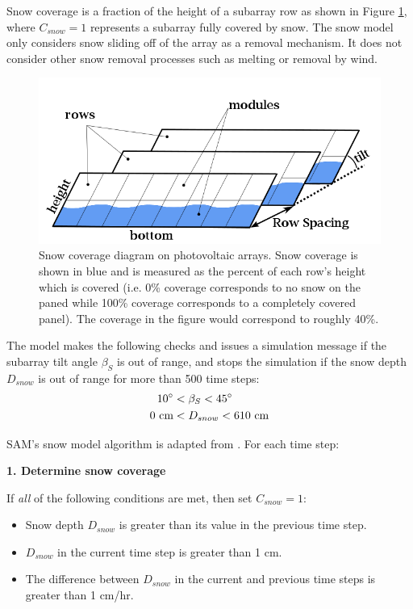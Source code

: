 \documentclass[12pt,letterpaper]{article}
\begin{document}
Snow coverage is a fraction of the height of a subarray row as shown in Figure \ref{fig-snowCoverage}, where $C_{snow}=1$ represents a subarray fully covered by snow. The snow model only considers snow sliding off of the array as a removal mechanism. It does not consider other snow removal processes such as melting or removal by wind.

\begin{figure}
\begin{center}
\includegraphics[scale=0.5]{snow-coverage-diagram}
\caption{Snow coverage diagram on photovoltaic arrays. Snow coverage is shown in blue and is measured as the percent of each row's height which is covered (i.e. 0\% coverage corresponds to no snow on the paned while 100\% coverage corresponds to a completely covered panel). The coverage in the figure would correspond to roughly 40\%.}
\label{fig-snowCoverage}
\end{center}
\end{figure}

The model makes the following checks and issues a simulation message if the subarray tilt angle $\beta_S$ is out of range, and stops the simulation if the snow depth $D_{snow}$ is out of range for more than 500 time steps:
\begin{align*}
10^\circ &< \beta_{S} < 45^\circ \notag \\
0~\text{cm} &< D_{snow} < 610~\text{cm}
\end{align*}

SAM's snow model algorithm is adapted from \citet{marion-snowmodel}. For each time step:

\textbf{1. Determine snow coverage}

If \textit{all} of the following conditions are met, then set $C_{snow}=1$:

\begin{itemize}
\item Snow depth $D_{snow}$ is greater than its value in the previous time step.
\item $D_{snow}$ in the current time step is greater than 1 cm.
\item The difference between $D_{snow}$ in the current and previous time steps is greater than 1 cm/hr.
\end{itemize}
\end{document}
